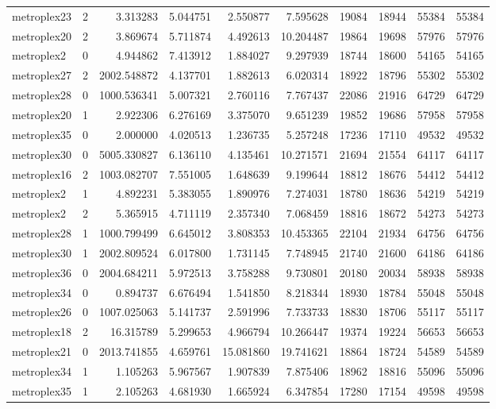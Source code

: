 \begin{longtable}{|l|r|r|r|r|r|r|r|r|r|}
metroplex23 & 2 & 3.313283 & 5.044751 & 2.550877 & 7.595628 & 19084 & 18944 & 55384 & 55384 \\
metroplex20 & 2 & 3.869674 & 5.711874 & 4.492613 & 10.204487 & 19864 & 19698 & 57976 & 57976 \\
metroplex2 & 0 & 4.944862 & 7.413912 & 1.884027 & 9.297939 & 18744 & 18600 & 54165 & 54165 \\
metroplex27 & 2 & 2002.548872 & 4.137701 & 1.882613 & 6.020314 & 18922 & 18796 & 55302 & 55302 \\
metroplex28 & 0 & 1000.536341 & 5.007321 & 2.760116 & 7.767437 & 22086 & 21916 & 64729 & 64729 \\
metroplex20 & 1 & 2.922306 & 6.276169 & 3.375070 & 9.651239 & 19852 & 19686 & 57958 & 57958 \\
metroplex35 & 0 & 2.000000 & 4.020513 & 1.236735 & 5.257248 & 17236 & 17110 & 49532 & 49532 \\
metroplex30 & 0 & 5005.330827 & 6.136110 & 4.135461 & 10.271571 & 21694 & 21554 & 64117 & 64117 \\
metroplex16 & 2 & 1003.082707 & 7.551005 & 1.648639 & 9.199644 & 18812 & 18676 & 54412 & 54412 \\
metroplex2 & 1 & 4.892231 & 5.383055 & 1.890976 & 7.274031 & 18780 & 18636 & 54219 & 54219 \\
metroplex2 & 2 & 5.365915 & 4.711119 & 2.357340 & 7.068459 & 18816 & 18672 & 54273 & 54273 \\
metroplex28 & 1 & 1000.799499 & 6.645012 & 3.808353 & 10.453365 & 22104 & 21934 & 64756 & 64756 \\
metroplex30 & 1 & 2002.809524 & 6.017800 & 1.731145 & 7.748945 & 21740 & 21600 & 64186 & 64186 \\
metroplex36 & 0 & 2004.684211 & 5.972513 & 3.758288 & 9.730801 & 20180 & 20034 & 58938 & 58938 \\
metroplex34 & 0 & 0.894737 & 6.676494 & 1.541850 & 8.218344 & 18930 & 18784 & 55048 & 55048 \\
metroplex26 & 0 & 1007.025063 & 5.141737 & 2.591996 & 7.733733 & 18830 & 18706 & 55117 & 55117 \\
metroplex18 & 2 & 16.315789 & 5.299653 & 4.966794 & 10.266447 & 19374 & 19224 & 56653 & 56653 \\
metroplex21 & 0 & 2013.741855 & 4.659761 & 15.081860 & 19.741621 & 18864 & 18724 & 54589 & 54589 \\
metroplex34 & 1 & 1.105263 & 5.967567 & 1.907839 & 7.875406 & 18962 & 18816 & 55096 & 55096 \\
metroplex35 & 1 & 2.105263 & 4.681930 & 1.665924 & 6.347854 & 17280 & 17154 & 49598 & 49598 \\

\end{longtable}
